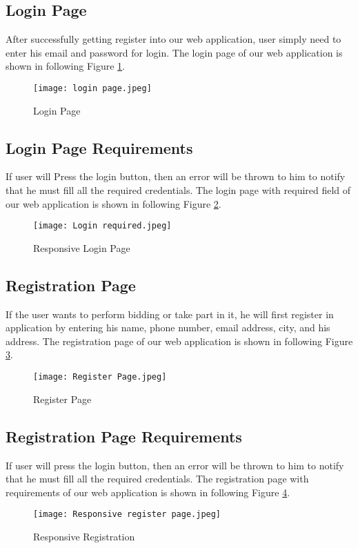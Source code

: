 \subsection{Login Page}
After successfully getting register into our web application, user simply need to enter his email and password for login. The login page of our web application is shown in following Figure \ref{lp}.\\
\begin{figure}[!h]
    \centering
    \texttt{[image: login page.jpeg]}
    \caption{Login Page}
    \label{lp}
\end{figure}
\newpage
\subsection{Login Page Requirements}
If user will Press the login button, then an error will be thrown to him to notify that he must fill all the required credentials. The login page with required field of our web application is shown in following Figure \ref{Lrf}.
\begin{figure}[!h]
    \centering
    \texttt{[image: Login required.jpeg]}
    \caption{Responsive Login Page}
    \label{Lrf}
\end{figure}


\subsection{Registration Page}
If the user wants to perform bidding or take part in it, he will first register in application by entering his name, phone number, email address, city, and his address. The registration page of our web application is shown in following Figure \ref{rp}.\\
\begin{figure}[!h]
    \centering
    \texttt{[image: Register Page.jpeg]}
    \caption{Register Page}
    \label{rp}
\end{figure}

\subsection{Registration Page Requirements}
If user will press the login button, then an error will be thrown to him to notify that he must fill all the required credentials. The registration page with requirements of our web application is shown in following Figure \ref{rpr}.
\begin{figure}[!h]
    \centering
    \texttt{[image: Responsive register page.jpeg]}
    \caption{Responsive Registration}
    \label{rpr}
\end{figure}
\newpage
